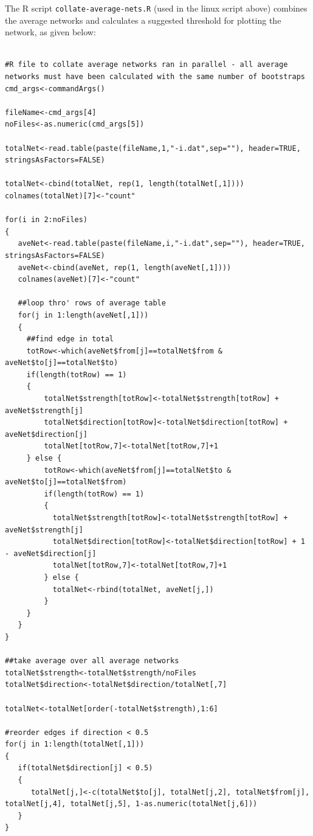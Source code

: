 \documentclass[a4paper,12pt]{article}
\newcommand{\code}[1]{{\footnotesize{{\tt #1}}}}
\begin{document}
The R script \code{collate-average-nets.R} (used in the linux script above) combines the average networks and calculates a suggested threshold for plotting the network, as given below: 
\vspace{0.35cm} \begin{lstlisting}

#R file to collate average networks ran in parallel - all average networks must have been calculated with the same number of bootstraps
cmd_args<-commandArgs()

fileName<-cmd_args[4]
noFiles<-as.numeric(cmd_args[5])

totalNet<-read.table(paste(fileName,1,"-i.dat",sep=""), header=TRUE, stringsAsFactors=FALSE)

totalNet<-cbind(totalNet, rep(1, length(totalNet[,1])))
colnames(totalNet)[7]<-"count"

for(i in 2:noFiles)
{
   aveNet<-read.table(paste(fileName,i,"-i.dat",sep=""), header=TRUE, stringsAsFactors=FALSE)
   aveNet<-cbind(aveNet, rep(1, length(aveNet[,1])))
   colnames(aveNet)[7]<-"count"
   
   ##loop thro' rows of average table
   for(j in 1:length(aveNet[,1]))
   {
     ##find edge in total
     totRow<-which(aveNet$from[j]==totalNet$from & aveNet$to[j]==totalNet$to)
     if(length(totRow) == 1)
     {
         totalNet$strength[totRow]<-totalNet$strength[totRow] + aveNet$strength[j]
         totalNet$direction[totRow]<-totalNet$direction[totRow] + aveNet$direction[j]
         totalNet[totRow,7]<-totalNet[totRow,7]+1
     } else {
         totRow<-which(aveNet$from[j]==totalNet$to & aveNet$to[j]==totalNet$from)
         if(length(totRow) == 1)
         {
           totalNet$strength[totRow]<-totalNet$strength[totRow] + aveNet$strength[j]
           totalNet$direction[totRow]<-totalNet$direction[totRow] + 1 - aveNet$direction[j]
           totalNet[totRow,7]<-totalNet[totRow,7]+1
         } else {     
           totalNet<-rbind(totalNet, aveNet[j,])            
         }     
     }     
   }
}

##take average over all average networks
totalNet$strength<-totalNet$strength/noFiles
totalNet$direction<-totalNet$direction/totalNet[,7]

totalNet<-totalNet[order(-totalNet$strength),1:6]

#reorder edges if direction < 0.5
for(j in 1:length(totalNet[,1]))
{
   if(totalNet$direction[j] < 0.5)
   {
      totalNet[j,]<-c(totalNet$to[j], totalNet[j,2], totalNet$from[j], totalNet[j,4], totalNet[j,5], 1-as.numeric(totalNet[j,6]))
   }
}


\end{lstlisting}
\end{document}
